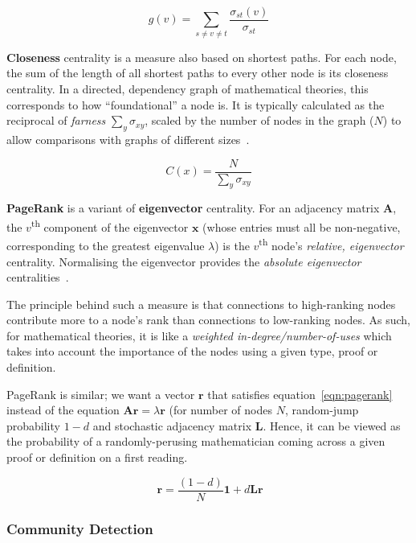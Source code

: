 \begin{equation}
  g\left(v\right) = \sum_{s \neq v \neq t} \frac{\sigma_{st}\left(v\right)}{\sigma_{st}}
\end{equation}

\textbf{Closeness} centrality is a measure also based on shortest paths. For
each node, the sum of the length of all shortest paths to every other node is
its closeness centrality. In a directed, dependency graph of mathematical
theories, this corresponds to how ``foundational'' a node is. It is typically
calculated as the reciprocal of \emph{farness} $\sum_{y}\sigma_{xy}$,
scaled by the number of nodes in the graph ($N$) to allow comparisons with
graphs of different sizes~{\citep{bavelas1950}}.

\begin{equation}
  C\left(x\right) = \frac{N}{\sum_{y}\sigma_{xy}}
\end{equation}

\textbf{PageRank} is a variant of \textbf{eigenvector} centrality.  For an
adjacency matrix $\mathbf{A}$, the $v$\textsuperscript{th} component of the
eigenvector $\mathbf{x}$ (whose entries must all be non-negative, corresponding
to the greatest eigenvalue $\lambda$) is the $v$\textsuperscript{th} node's
\emph{relative, eigenvector} centrality. Normalising the eigenvector provides
the \emph{absolute eigenvector} centralities~{\citep{newman2008}}.

The principle behind such a measure is that connections to high-ranking nodes
contribute more to a node's rank than connections to low-ranking nodes.  As
such, for mathematical theories, it is like a \emph{weighted
in-degree/number-of-uses} which takes into account the importance of the nodes
using a given type, proof or definition.

PageRank is similar; we want a vector $\mathbf{r}$ that satisfies
equation~\ref{eqn:pagerank}~{\citep{page1999}} instead of the equation $\mathbf{Ar}
= \lambda\mathbf{r}$ (for number of nodes $N$, random-jump probability $1-d$ and
stochastic adjacency matrix $\mathbf{L}$. Hence, it can be viewed as the
probability of a randomly-perusing mathematician coming across a given proof or
definition on a first reading.

\begin{equation}~\label{eqn:pagerank}
  \mathbf{r} = \frac{\left(1-d\right)}{N} \mathbf{1} + d\mathbf{Lr}
\end{equation}

\subsubsection{Community Detection}

